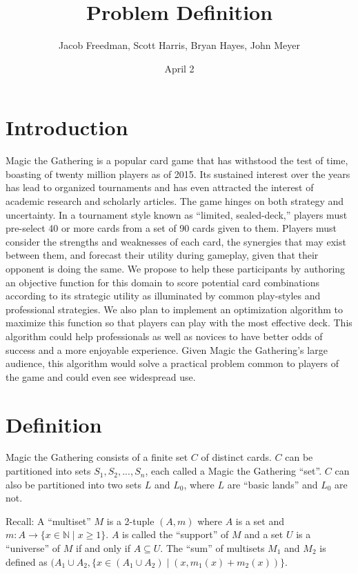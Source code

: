 \documentclass[12pt, letterpaper]{article}
\title{Problem Definition}
\date{April 2}
\author{Jacob Freedman, Scott Harris, Bryan Hayes, John Meyer}
\begin{document}
\maketitle

\section{Introduction}

Magic the Gathering is a popular card game that has withstood the test of time,
boasting of twenty million players as of 2015.
Its sustained interest over the years has lead to organized tournaments
and has even attracted the interest of academic research and scholarly articles.
The game hinges on both strategy and uncertainty.
In a tournament style known as \enquote{limited, sealed-deck,}
players must pre-select 40 or more cards from a set of 90 cards given to them.
Players must consider the strengths and weaknesses of each card,
the synergies that may exist between them,
and forecast their utility during gameplay,
given that their opponent is doing the same.
We propose to help these participants by authoring an objective function for this
domain to score potential card combinations according to its strategic utility
as illuminated by common play-styles and professional strategies.
We also plan to implement an optimization algorithm to maximize this function
so that players can play with the most effective deck.
This algorithm could help professionals as well as novices to have better odds of success
and a more enjoyable experience.
Given Magic the Gathering’s large audience,
this algorithm would solve a practical problem common to players of the game
and could even see widespread use.

\section{Definition}

Magic the Gathering consists of a finite set $ C $ of distinct cards.
$ C $ can be partitioned into sets $ S_1, S_2, ..., S_n $, each called a Magic the Gathering \enquote{set}.
$ C $ can also be partitioned into two sets $ L $ and $ L_0 $, where $ L $ are \enquote{basic lands} and $ L_0 $ are not.

Recall: A \enquote{multiset} $ M $ is a 2-tuple $ (A, m) $
where $ A $ is a set and $ m: A \rightarrow \{x \in \mathbb{N} \mid x \ge 1 \} $.
$ A $ is called the \enquote{support} of $ M $ and
a set $ U $ is a \enquote{universe} of $ M $ if and only if $ A \subseteq U $.
The \enquote{sum} of multisets $ M_1 $ and $ M_2 $ is defined as
$ (A_1 \cup A_2, \{ x \in (A_1 \cup A_2) \mid (x, m_1(x) + m_2(x)) \} $.
\end{document}
